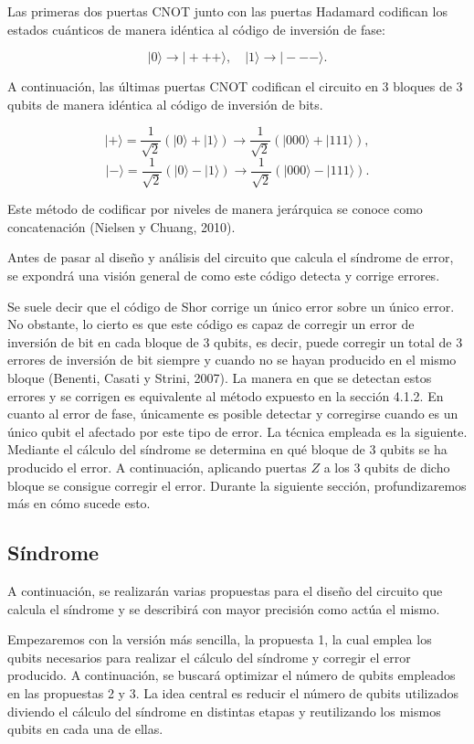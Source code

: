 Las primeras dos puertas CNOT junto con las puertas Hadamard codifican los estados cuánticos de manera idéntica al código de inversión de fase:

$$ | 0 \rangle \to | +++ \rangle, \quad |1 \rangle \to | --- \rangle .$$

A continuación, las últimas puertas CNOT codifican el circuito en 3 bloques de 3 qubits de manera idéntica al código de inversión de bits. 

$$ | + \rangle = \frac{1}{\sqrt{2}} (| 0 \rangle + | 1 \rangle ) \to \frac{1}{\sqrt{2}} (| 000 \rangle + | 111 \rangle ), $$
$$ | - \rangle = \frac{1}{\sqrt{2}} (| 0 \rangle - | 1 \rangle ) \to \frac{1}{\sqrt{2}} (| 000 \rangle - | 111 \rangle ). $$

Este método de codificar por niveles de manera jerárquica se conoce como concatenación (Nielsen y Chuang, 2010).

Antes de pasar al diseño y análisis del circuito que calcula el síndrome de error, se expondrá una visión general de como este código detecta y corrige errores. 

Se suele decir que el código de Shor corrige un único error sobre un único error. No obstante, lo cierto es que este código es capaz de corregir un error de inversión de bit en cada bloque de 3 qubits, es decir, puede corregir un total de 3 errores de inversión de bit siempre y cuando no se hayan producido en el mismo bloque (Benenti, Casati y Strini, 2007). La manera en que se detectan estos errores y se corrigen es equivalente al método expuesto en la sección 4.1.2. En cuanto al error de fase, únicamente es posible detectar y corregirse cuando es un único qubit el afectado por este tipo de error. La técnica empleada es la siguiente. Mediante el cálculo del síndrome se determina en qué bloque de 3 qubits se ha producido el error. A continuación, aplicando puertas $Z$ a los 3 qubits de dicho bloque se consigue corregir el error. Durante la siguiente sección, profundizaremos más en cómo sucede esto. 

\subsection{Síndrome}

A continuación, se realizarán varias propuestas para el diseño del circuito que calcula el síndrome y se describirá con mayor precisión como actúa el mismo. 

Empezaremos con la versión más sencilla, la propuesta 1, la cual emplea los qubits necesarios para realizar el cálculo del síndrome y corregir el error producido. A continuación, se buscará optimizar el número de qubits empleados en las propuestas 2 y 3. La idea central es reducir el número de qubits utilizados diviendo el cálculo del síndrome en distintas etapas y reutilizando los mismos qubits en cada una de ellas.

